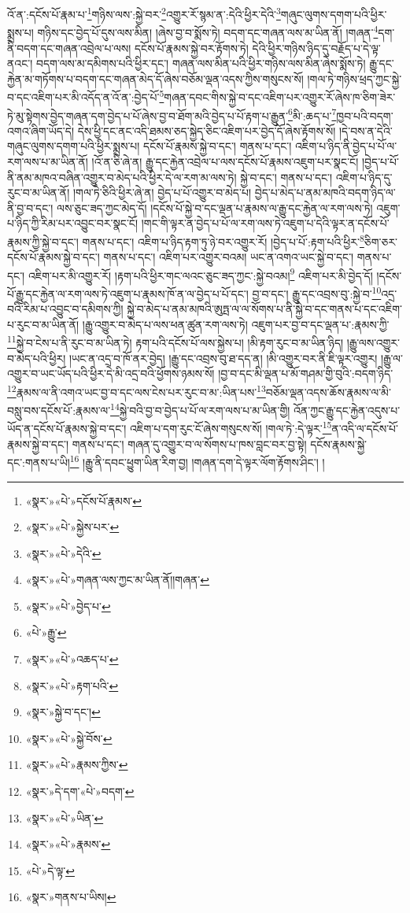འོ་ན་:དངོས་པོ་རྣམ་པ་\footnote{«སྣར་»«པེ་»དངོས་པོ་རྣམས་}གཉིས་ལས་:སྐྱེ་བར་\footnote{«སྣར་»«པེ་»སྐྱེས་པར་}འགྱུར་རོ་སྙམ་ན་:དེའི་ཕྱིར་དེའི་\footnote{«སྣར་»«པེ་»དེའི་}གཞུང་ལུགས་དགག་པའི་ཕྱིར་སྨྲས་པ། གཉིས་དང་བྱེད་པོ་དུས་ལས་མིན། །ཞེས་བྱ་བ་སྨོས་ཏེ། བདག་དང་གཞན་ལས་མ་ཡིན་ནོ། །གཞན་\footnote{«སྣར་»«པེ་»གཞན་ལས་ཀྱང་མ་ཡིན་ནོ།།གཞན་}དག་ནི་བདག་དང་གཞན་འབྲེལ་པ་ལས། དངོས་པོ་རྣམས་སྐྱེ་བར་རྟོགས་ཏེ། དེའི་ཕྱིར་གཉིས་ཉིད་དུ་བརྗོད་པ་དེ་ལྟ་ནའང་། བདག་ལས་མ་དམིགས་པའི་ཕྱིར་དང་། གཞན་ལས་མིན་པའི་ཕྱིར་གཉིས་ལས་མིན་ཞེས་སྨོས་ཏེ། རྒྱུ་དང་རྐྱེན་མ་གཏོགས་པ་བདག་དང་གཞན་མེད་དོ་ཞེས་བཅོམ་ལྡན་འདས་ཀྱིས་གསུངས་སོ། །གལ་ཏེ་གཉིས་ཕྲད་ཀྱང་སྐྱེ་བ་དང་འཇིག་པར་མི་འདོད་ན་འོ་ན་:བྱེད་པོ་\footnote{«སྣར་»«པེ་»བྱེད་པ་}གཞན་དབང་གིས་སྐྱེ་བ་དང་འཇིག་པར་འགྱུར་རོ་ཞེས་ཁ་ཅིག་ཟེར་ཏེ་མུ་སྟེགས་བྱེད་གཞན་དག་བྱེད་པ་པོ་ཞེས་བྱ་བ་ཐོག་མའི་བྱེད་པ་པོ་རྟག་པ་རྒྱུན་\footnote{«པེ་»རྒྱུ་}མི་:ཆད་པ་\footnote{«སྣར་»«པེ་»འཆད་པ་}ཁྱབ་པའི་བདག་འགའ་ཞིག་ཡོད་དེ། དེས་ཕྱི་དང་ནང་འདི་ཐམས་ཅད་སྐྱེད་ཅིང་འཇིག་པར་བྱེད་དོ་ཞེས་རྟོགས་སོ། །དེ་བས་ན་དེའི་གཞུང་ལུགས་དགག་པའི་ཕྱིར་སྨྲས་པ། དངོས་པོ་རྣམས་སྐྱེ་བ་དང་། གནས་པ་དང་། འཇིག་པ་ཉིད་ནི་བྱེད་པ་པོ་ལ་རག་ལས་པ་མ་ཡིན་ནོ། །འོ་ན་ཅི་ཞེ་ན། རྒྱུ་དང་རྐྱེན་འབྲེལ་པ་ལས་དངོས་པོ་རྣམས་འཇུག་པར་སྣང་ངོ། །བྱེད་པ་པོ་ནི་ནམ་མཁའ་བཞིན་འགྱུར་བ་མེད་པའི་ཕྱིར་དེ་ལ་རག་མ་ལས་ཏེ། སྐྱེ་བ་དང་། གནས་པ་དང་། འཇིག་པ་ཉིད་དུ་རུང་བ་མ་ཡིན་ནོ། །གལ་ཏེ་ཅིའི་ཕྱིར་ཞེ་ན། བྱེད་པ་པོ་འགྱུར་བ་མེད་པ། བྱེད་པ་མེད་པ་ནམ་མཁའི་བདག་ཉིད་ལ་ནི་བྱ་བ་དང་། ལས་ཅུང་ཟད་ཀྱང་མེད་དོ། །དངོས་པོ་སྐྱེ་བ་དང་ལྡན་པ་རྣམས་ལ་རྒྱུ་དང་རྐྱེན་ལ་རག་ལས་ཏེ། འཇུག་པ་ཉིད་ཀྱི་རིམ་པར་འབྱུང་བར་སྣང་ངོ། །གང་གི་ལྟར་ན་བྱེད་པ་པོ་ལ་རག་ལས་ཏེ་འཇུག་པ་དེའི་ལྟར་ན་དངོས་པོ་རྣམས་ཀྱི་སྐྱེ་བ་དང་། གནས་པ་དང་། འཇིག་པ་ཉིད་རྟག་ཏུ་ཉེ་བར་འགྱུར་རོ། །བྱེད་པ་པོ་:རྟག་པའི་ཕྱིར་\footnote{«སྣར་»«པེ་»རྟག་པའི་}ཅིག་ཅར་དངོས་པོ་རྣམས་སྐྱེ་བ་དང་། གནས་པ་དང་། འཇིག་པར་འགྱུར་བའམ། ཡང་ན་འགའ་ཡང་སྐྱེ་བ་དང་། གནས་པ་དང་། འཇིག་པར་མི་འགྱུར་རོ། །རྟག་པའི་ཕྱིར་གང་ལའང་ཅུང་ཟད་ཀྱང་:སྐྱེ་བའམ།\footnote{«སྣར་»སྐྱེ་བ་དང་།} འཇིག་པར་མི་བྱེད་དོ། །དངོས་པོ་རྒྱུ་དང་རྐྱེན་ལ་རག་ལས་ཏེ་འཇུག་པ་རྣམས་ཁོ་ན་ལ་བྱེད་པ་པོ་དང་། བྱ་བ་དང་། རྒྱུ་དང་འབྲས་བུ་:སྐྱེ་བ་\footnote{«སྣར་»«པེ་»སྐྱེ་བོས་}འདྲ་བའི་རིམ་པ་འབྱུང་བ་དམིགས་ཀྱི། སྐྱེ་བ་མེད་པ་ནམ་མཁའི་ཨུཏྤ་ལ་ལ་སོགས་པ་ནི་སྐྱེ་བ་དང་གནས་པ་དང་འཇིག་པ་རུང་བ་མ་ཡིན་ནོ། །རྒྱུ་འགྱུར་བ་མེད་པ་ལས་ཕན་ཚུན་རག་ལས་ཏེ། འཇུག་པར་བྱ་བ་དང་ལྡན་པ་:རྣམས་ཀྱི་\footnote{«སྣར་»«པེ་»རྣམས་ཀྱིས་}སྐྱེ་བ་ངེས་པ་ནི་རུང་བ་མ་ཡིན་ཏེ། རྟག་པའི་དངོས་པོ་ལས་སྐྱེས་པ། །མི་རྟག་རུང་བ་མ་ཡིན་ཉིད། །རྒྱུ་ལས་འགྱུར་བ་མེད་པའི་ཕྱིར། །ཡང་ན་འདྲ་བ་ཁོ་ནར་བྱེད། །རྒྱུ་དང་འབྲས་བུ་ཐ་དད་ན། །མི་འགྱུར་བར་ནི་ཇི་ལྟར་འགྱུར། །རྒྱུ་ལ་འགྱུར་བ་ཡང་ཡོད་པའི་ཕྱིར་དེ་མི་འདྲ་བའི་ཕྱོགས་ཉམས་སོ། །བྱ་བ་དང་མི་ལྡན་པ་མོ་གཤམ་གྱི་བུའི་:བདག་ཉིད་\footnote{«སྣར་»དེ་དག་«པེ་»བདག་}རྣམས་ལ་ནི་འགའ་ཡང་བྱ་བ་དང་ལས་ངེས་པར་རུང་བ་མ་:ཡིན་པས་\footnote{«སྣར་»«པེ་»ཡིན་}བཅོམ་ལྡན་འདས་ཆོས་རྣམས་ལ་མི་བསླུ་བས་དངོས་པོ་:རྣམས་ལ་\footnote{«སྣར་»«པེ་»རྣམས་}སྐྱེ་བའི་བྱ་བ་བྱེད་པ་པོ་ལ་རག་ལས་པ་མ་ཡིན་གྱི། འོན་ཀྱང་རྒྱུ་དང་རྐྱེན་འདུས་པ་ཡོད་ན་དངོས་པོ་རྣམས་སྐྱེ་བ་དང་། འཇིག་པ་དག་རུང་ངོ་ཞེས་གསུངས་སོ། །གལ་ཏེ་:དེ་ལྟར་\footnote{«པེ་»དེ་ལྟ་}ན་འདི་ལ་དངོས་པོ་རྣམས་སྐྱེ་བ་དང་། གནས་པ་དང་། གཞན་དུ་འགྱུར་བ་ལ་སོགས་པ་ཁས་བླང་བར་བྱ་སྟེ། དངོས་རྣམས་སྐྱེ་དང་:གནས་པ་ཡི།\footnote{«སྣར་»གནས་པ་ཡིས།} །རྒྱུ་ནི་དབང་ཕྱུག་ཡིན་རིག་བྱ། །གཞན་དག་དེ་ལྟར་ལོག་རྟོགས་ཤིང་། །
